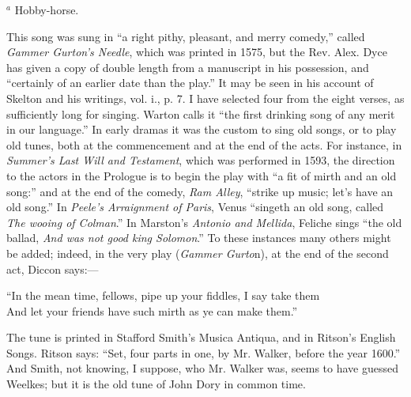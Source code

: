 \begin{center}
\scriptsize $^{a}$ Hobby-horse.
\end{center}
\normalsize

\pagebreak


This song was sung in “a right pithy, pleasant, and merry comedy,” called
\textit{Gammer Gurton’s Needle}, which was printed in 1575, but the Rev. Alex. Dyce
has given a copy of double length from a manuscript in his possession, and
“certainly of an earlier date than the play.” It may be seen in his account of
Skelton and his writings, vol. i., p. 7. I have selected four from the eight
verses, as sufficiently long for singing. Warton calls it “the first drinking song of
any merit in our language.” In early dramas it was the custom to sing old songs,
or to play old tunes, both at the commencement and at the end of the acts. For
instance, in \textit{Summer’s Last Will and Testament}, which was performed in 1593,
the direction to the actors in the Prologue is to begin the play with “a fit
of mirth and an old song:” and at the end of the comedy, \textit{Ram Alley}, “strike up
music; let’s have an old song.” In \textit{Peele’s Arraignment of Paris}, Venus “singeth
an old song, called \textit{The wooing of Colman}.” In Marston’s \textit{Antonio and Mellida},
Feliche sings “the old ballad, \textit{And was not good king Solomon}.” To these instances
many others might be added; indeed, in the very play (\textit{Gammer Gurto}n),
at the end of the second act, Diccon says:—

\settowidth{\versewidth}{“In the mean time, fellows, pipe up your fiddles, I say take them}
\begin{scverse}
“In the mean time, fellows, pipe up your fiddles, I say take them\\
And let your friends have such mirth as ye can make them.”
\end{scverse}

The tune is printed in Stafford Smith’s Musica Antiqua, and in Ritson’s English
Songs. Ritson says: “Set, four parts in one, by Mr. Walker, before the year
1600.” And Smith, not knowing, I suppose, who Mr. Walker was, seems to have
guessed Weelkes; but it is the old tune of John Dory in common time.





